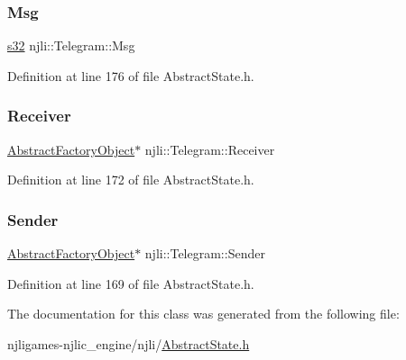 \subsubsection{\texorpdfstring{Msg}{Msg}}
{\footnotesize\ttfamily \mbox{\hyperlink{_util_8h_aa62c75d314a0d1f37f79c4b73b2292e2}{s32}} njli\+::\+Telegram\+::\+Msg}



Definition at line 176 of file Abstract\+State.\+h.

\mbox{\label{classnjli_1_1_telegram_aa2811ae30fb5bcbdb6dfd89bd1305b52}} 
\subsubsection{\texorpdfstring{Receiver}{Receiver}}
{\footnotesize\ttfamily \mbox{\hyperlink{classnjli_1_1_abstract_factory_object}{Abstract\+Factory\+Object}}$\ast$ njli\+::\+Telegram\+::\+Receiver}



Definition at line 172 of file Abstract\+State.\+h.

\mbox{\label{classnjli_1_1_telegram_ac8d9684f9beb98cdbfb912cefb18f036}} 
\subsubsection{\texorpdfstring{Sender}{Sender}}
{\footnotesize\ttfamily \mbox{\hyperlink{classnjli_1_1_abstract_factory_object}{Abstract\+Factory\+Object}}$\ast$ njli\+::\+Telegram\+::\+Sender}



Definition at line 169 of file Abstract\+State.\+h.



The documentation for this class was generated from the following file\+:\begin{DoxyCompactItemize}
\item 
njligames-\/njlic\+\_\+engine/njli/\mbox{\hyperlink{_abstract_state_8h}{Abstract\+State.\+h}}\end{DoxyCompactItemize}
